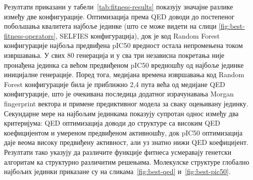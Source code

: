 \documentclass[12pt,oneside]{memoir}
\begin{document}
Резултати приказани у табели~\ref{tab:fitness-results} показују
значајне разлике између две конфигурације. Оптимизација према QED
доводи до постепеног побољшања квалитета најбоље јединке (што 
се може видети на слици \ref{fig:best-fitness-operators}, SELFIES конфигурација), док је
код Random Forest конфигурације најбоља предвиђена pIC50 вредност
остала непромењена током извршавања. 
У свих 80 генерација и у сва три независна покретања није 
пронађена јединка са већом предвиђеном pIC50 вредношћу од 
најбоље јединке иницијалне генерације.
Поред тога, медијана времена извршавања код Random Forest
конфигурације била је приближно 2,4 пута већа од медијане
QED конфигурације, што је очекивана последица додатног
израчунавања Morgan fingerprint вектора и примене
предиктивног модела за сваку оцењивану јединку. Секундарне мере на
најбољим јединкама показују супротан однос између два критеријума:
QED оптимизација доводи до структуре са високим QED коефицијентом
и умереном предвиђеном активношћу, док pIC50 оптимизација даје
веома високу предвиђену активност, али уз знатно нижи QED
коефицијент. Резултати тако указују да различите функције фитнеса
усмеравају генетски алгоритам ка структурно различитим решењима.
Молекулске структуре глобално најбољих јединки приказане су
на сликама~\ref{fig:best-qed} и~\ref{fig:best-pic50}.

\begin{table}[!ht]
  \centering
  \small
  \setlength{\tabcolsep}{4pt}
  \renewcommand{\arraystretch}{1.15}
  \caption{Резултати поређења функција фитнеса}
  \label{tab:fitness-results}
\end{table}
\end{document}

